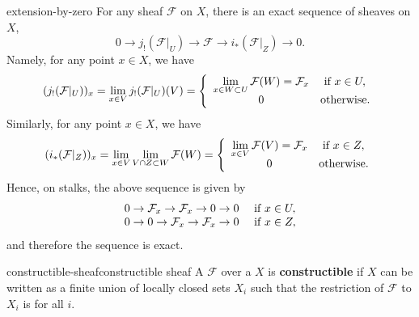 \begin{example}{extension-by-zero}
    For any sheaf $\mathcal{F}$ on $X$, there is an exact sequence of sheaves on $X$,
    \[ 0 \to j_!(\mathcal{F}|_U) \to \mathcal{F} \to i_*(\mathcal{F}|_Z) \to 0 . \]
    Namely, for any point $x \in X$, we have
    \[ (j_!(\mathcal{F}|_U))_x = \lim_{x \in V} j_!(\mathcal{F}|_U)(V) = \left\{ \begin{array}{cl}
        \lim\limits_{x \in W \subset U} \mathcal{F}(W) = \mathcal{F}_x & \textup{ if } x \in U, \\
        0 & \textup{otherwise} .
    \end{array} \right. \]
    Similarly, for any point $x \in X$, we have
    \[ (i_*(\mathcal{F}|_Z))_x = \lim_{x \in V} \lim_{V \cap Z \subset W} \mathcal{F}(W) = \left\{ \begin{array}{cl}
        \lim\limits_{x \in V} \mathcal{F}(V) = \mathcal{F}_x & \textup{ if } x \in Z, \\
        0 & \textup{otherwise} .
    \end{array} \right. \]
    Hence, on stalks, the above sequence is given by
    \[ \begin{array}{cl}
        0 \to \mathcal{F}_x \to \mathcal{F}_x \to 0 \to 0 & \textup{ if } x \in U , \\
        0 \to 0 \to \mathcal{F}_x \to \mathcal{F}_x \to 0 & \textup{ if } x \in Z ,
    \end{array} \]
    and therefore the sequence is exact.
\end{example}

\begin{topic}{constructible-sheaf}{constructible sheaf}
    A  $\mathcal{F}$ over a  $X$ is \textbf{constructible} if $X$ can be written as a finite union of locally closed sets $X_i$ such that the restriction of $\mathcal{F}$ to $X_i$ is  for all $i$.
\end{topic}
